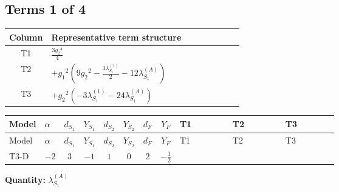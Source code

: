 \documentclass[8pt]{article}
\begin{document}
\begin{landscape}
\subsection*{Terms 1 of 4}
\begin{center}
\begin{tabular}{@{}c >{\raggedright\arraybackslash}p{0.82\linewidth}@{}}
\toprule
Column & Representative term structure \\
\midrule
T1 & \(\displaystyle \frac{3 {g_2}^4}{4}\) \\
\midrule
T2 & \(\displaystyle +{g_1}^2 \left(9 {g_2}^2-\frac{3 {\lambda_{S_1}^{(1)}}}{2}-12 {\lambda_{S_1}^{(A)}}\right)\) \\
\midrule
T3 & \(\displaystyle +{g_2}^2 (-3 {\lambda_{S_1}^{(1)}}-24 {\lambda_{S_1}^{(A)}})\) \\
\midrule
\bottomrule
\end{tabular}
\end{center}
\smallskip
\tiny
\begin{longtable}{@{}llcccccc >{\raggedright\arraybackslash}p{0.21\linewidth} >{\raggedright\arraybackslash}p{0.21\linewidth} >{\raggedright\arraybackslash}p{0.21\linewidth}@{}}
\toprule
Model & $\alpha$ & $d_{S_1}$ & $Y_{S_1}$ & $d_{S_2}$ & $Y_{S_2}$ & $d_F$ & $Y_F$ & T1 & T2 & T3 \\
\midrule
\endfirsthead
\toprule
Model & $\alpha$ & $d_{S_1}$ & $Y_{S_1}$ & $d_{S_2}$ & $Y_{S_2}$ & $d_F$ & $Y_F$ & T1 & T2 & T3 \\
\midrule
\endhead
T3-D & $-2$ & $3$ & $-1$ & $1$ & $0$ & $2$ & $-\frac{1}{2}$ & \scriptsize\adjustbox{max width=\linewidth}{$\begin{gathered} \frac{3 {g_2}^4}{4}\end{gathered}$} & \scriptsize\adjustbox{max width=\linewidth}{$\begin{gathered} +{g_1}^2 \left(9 {g_2}^2-\frac{3 {\lambda_{S_1}^{(1)}}}{2}-12 {\lambda_{S_1}^{(A)}}\right)\end{gathered}$} & \scriptsize\adjustbox{max width=\linewidth}{$\begin{gathered} +{g_2}^2 (-3 {\lambda_{S_1}^{(1)}}-24 {\lambda_{S_1}^{(A)}})\end{gathered}$} \\
\midrule
\bottomrule
\end{longtable}
\clearpage
\noindent\textbf{Quantity: }$\lambda_{S_1}^{(A)}$\par\smallskip

\end{landscape}
\end{document}

